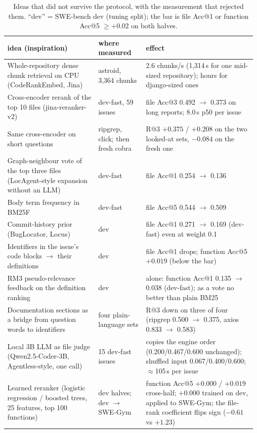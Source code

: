 \begin{table}[t]
\centering
\small
\caption{Ideas that did not survive the protocol, with the measurement that rejected them. ``dev'' =
SWE-bench dev (tuning split); the bar is file Acc@1 or function Acc@5 $\geq +0.02$ on both halves.}
\label{tab:negative}
\begin{tabular}{@{}p{}p{}p{}@{}}
\toprule
idea (inspiration) & where measured & effect\\
\midrule
Whole-repository dense chunk retrieval on CPU (CodeRankEmbed, Jina) & astroid, 3,364 chunks & 2.6 chunks/s (1,314\,s for one mid-sized repository); hours for django-sized ones\\
Cross-encoder rerank of the top 10 files (jina-reranker-v2) & dev-fast, 59 issues & file Acc@3 0.492 $\to$ 0.373 on long reports; 8.0\,s p50 per issue\\
Same cross-encoder on short questions & ripgrep, click; then fresh cobra & R@3 $+0.375$ / $+0.208$ on the two looked-at sets, $-0.084$ on the fresh one\\
Graph-neighbour vote of the top three files (LocAgent-style expansion without an LLM) & dev-fast & file Acc@1 0.254 $\to$ 0.136\\
Body term frequency in BM25F & dev-fast & file Acc@5 0.544 $\to$ 0.509\\
Commit-history prior (BugLocator, Locus) & dev & file Acc@1 0.271 $\to$ 0.169 (dev-fast) even at weight 0.1\\
Identifiers in the issue's code blocks $\to$ their definitions & dev & file Acc@1 drops; function Acc@5 $+0.019$ (below the bar)\\
RM3 pseudo-relevance feedback on the definition ranking & dev & alone: function Acc@1 0.135 $\to$ 0.038 (dev-fast); as a vote no better than plain BM25\\
Documentation sections as a bridge from question words to identifiers & four plain-language sets & R@3 down on three of four (ripgrep 0.500 $\to$ 0.375, axios 0.833 $\to$ 0.583)\\
Local 3B LLM as file judge (Qwen2.5-Coder-3B, Agentless-style, one call) & 15 dev-fast issues & copies the engine order (0.200/0.467/0.600 unchanged); shuffled input 0.067/0.400/0.600; $\approx$105\,s per issue\\
Learned reranker (logistic regression / boosted trees, 25 features, top 100 functions) & dev halves; dev $\to$ SWE-Gym & function Acc@5 $+0.000$ / $+0.019$ cross-half; $+0.000$ trained on dev, applied to SWE-Gym; the file-rank coefficient flips sign ($-0.61$ vs $+1.23$)\\

\end{tabular}
\end{table}
